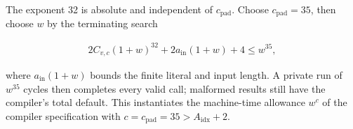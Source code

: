 \begin{lemma}
The exponent 32 is absolute and independent of \(c_{\mathrm{pad}}\). Choose \(c_{\mathrm{pad}}=35\), then choose \(w\) by the terminating search

\begin{equation}\label{q1:e8.1}
\begin{gathered}
2 C_{v,c}(1+w)^{32} + 2 a_{\mathrm{in}}(1+w)+4 \le  w^{35},
\end{gathered}
\end{equation}

where \(a_{\mathrm{in}}(1+w)\) bounds the finite literal and input length. A private run of \(w^{35}\) cycles then completes every valid call; malformed results still have the compiler's total default. This instantiates the machine-time allowance \(w^{c}\) of the compiler specification with \(c=c_{\mathrm{pad}}=35>A_{\mathrm{idx}}+2\).

\end{lemma}
